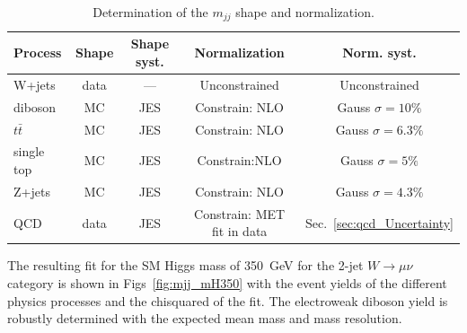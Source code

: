 \begin{table}[!ht]
  \begin{center}
 \caption{Determination of the $m_{jj}$ shape and normalization.}  
 \label{tab:mjj_shapes_and_normalization} 
 \begin{tabular} {l  c  c c c }
   \hline \hline
   Process                &    Shape                         &  Shape syst.           & Normalization   &  Norm. syst.\\  \hline
   W+jets                 &    data                      &  ---  & Unconstrained   &  Unconstrained \\
   diboson                &    MC                            &  JES                   & Constrain: NLO        &  Gauss $\sigma =10\%$ \\ 
   $t\bar{t}$ &    MC                            &  JES                   & Constrain: NLO        &  Gauss $\sigma =6.3\%$  \\ 
   single top & MC & JES & Constrain:NLO & Gauss $\sigma=5\%$ \\
   Z+jets                 &    MC                            &  JES                   & Constrain: NLO        &  Gauss $\sigma =4.3\%$  \\
   QCD                    &    data                          &  JES                   & Constrain: MET fit in data  &  Sec.~\ref{sec:qcd_Uncertainty}  \\\hline \hline
 \end{tabular}
\end{center}
\end{table}


The resulting fit for the SM Higgs mass of 350~GeV for the 2-jet
$W\to\mu\nu$ category is shown in Figs~\ref{fig:mjj_mH350} with the
event yields of the different physics processes and the chisquared of
the fit. 
The electroweak diboson yield is robustly determined with the expected mean mass and mass resolution. 


